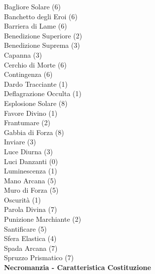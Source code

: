 \begin{multicols}{3}
{	
	Bagliore Solare (6)\\
	Banchetto degli Eroi (6)\\
	Barriera di Lame (6)\\
	Benedizione Superiore (2)\\
	Benedizione Suprema (3)\\
	Capanna (3)\\
	Cerchio di Morte (6)\\
	Contingenza (6)\\
	Dardo Tracciante (1)\\
	Deflagrazione Occulta (1)\\
	Esplosione Solare (8)\\
	Favore Divino (1)\\
	Frantumare (2)\\
	Gabbia di Forza (8)\\
	Inviare (3)\\
	Luce Diurna (3)\\
	Luci Danzanti (0)\\
	Luminescenza (1)\\
	Mano Arcana (5)\\
	Muro di Forza (5)\\
	Oscurità (1)\\
	Parola Divina (7)\\
	Punizione Marchiante (2)\\
	Santificare (5)\\
	Sfera Elastica (4)\\
	Spada Arcana (7)\\
	Spruzzo Prismatico (7)\\

	\medskip\textbf{Necromanzia - Caratteristica Costituzione}

}
\end{multicols}
